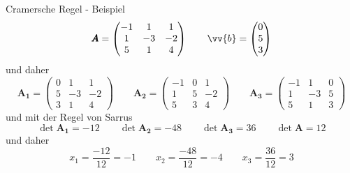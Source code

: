 \begin{frame}{Cramersche Regel - Beispiel}
		\[
		\pmb{A}= \begin{pmatrix}
		-1 & 1 & 1 \\
		1 & -3 & -2 \\
		5 & 1 & 4
		\end{pmatrix}
		\qquad
		\vv{b} = \begin{pmatrix}
		0 \\ 5 \\ 3
		\end{pmatrix}
		\]
		und daher \footnotesize{
		\[
		\pmb{A_1}= \begin{pmatrix}
		0 & 1 & 1 \\
		5 & -3 & -2 \\
		3 & 1 & 4
		\end{pmatrix}
		\qquad
		\pmb{A_2}= \begin{pmatrix}
		-1 & 0 & 1 \\
		1 & 5 & -2 \\
		5 & 3 & 4
		\end{pmatrix}
		\qquad
		\pmb{A_3}= \begin{pmatrix}
		-1 & 1 & 0 \\
		1 & -3 & 5 \\
		5 & 1 & 3
		\end{pmatrix}
		\]
		}
		und mit der Regel von Sarrus
		\[
		\det \pmb{A_1} = -12 \qquad \det \pmb{A_2} = -48
 \qquad \det \pmb{A_3} = 36 \qquad \det \pmb{A} = 12		
 \]
	und daher
	\[
	x_{1} = \frac{-12}{12} = -1 \qquad x_{2} = \frac{-48}{12} = -4 \qquad x_{3} = \frac{36}{12} = 3
	\]	
\end{frame}
